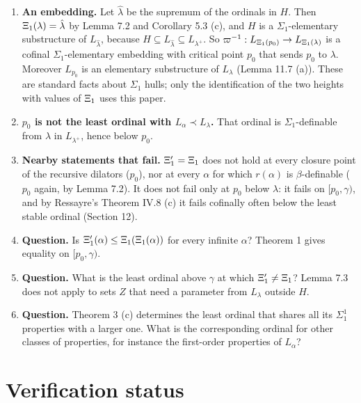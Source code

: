 \documentclass[11pt]{article}
\begin{document}
\begin{enumerate}
\item \textbf{An embedding.} Let $\hat \lambda$ be the supremum of the ordinals in $H$. Then $\Xi_1(\lambda) = \hat \lambda$ by Lemma
  7.2 and Corollary 5.3 (c), and $H$ is a $\Sigma_1$-elementary substructure of $L_{\hat \lambda}$, because
  $H \subseteq L_{\hat \lambda} \subseteq L_{\lambda^+}$. So $\varpi^{-1} : L_{\Xi_1(p_0)} \to L_{\Xi_1(\lambda)}$ is a cofinal
  $\Sigma_1$-elementary embedding with critical point $p_0$ that sends $p_0$ to $\lambda$. Moreover $L_{p_0}$ is
  an elementary substructure of $L_\lambda$ (Lemma 11.7 (a)). These are standard facts about $\Sigma_1$ hulls; only the
  identification of the two heights with values of $\Xi_1$ uses this paper.
\item \textbf{$p_0$ is not the least ordinal with $L_{\alpha} \prec L_\lambda$.} That ordinal is $\Sigma_1$-definable
  from $\lambda$ in $L_{\lambda^+}$, hence below $p_0$.
\item \textbf{Nearby statements that fail.} $\Xi'_1 = \Xi_1$ does not hold at every closure point of the recursive
  dilators ($p_0$), nor at every $\alpha$ for which $r(\alpha)$ is $\beta$-definable ($p_0$ again, by Lemma
  7.2). It does not fail only at $p_0$ below $\lambda$: it fails on $[p_0, \gamma)$, and by Ressayre's Theorem IV.8
  (c) it fails cofinally often below the least stable ordinal (Section 12).
\item \textbf{Question.} Is $\Xi'_1(\alpha) \le \Xi_1(\Xi_1(\alpha))$ for every infinite $\alpha$? Theorem 1 gives
  equality on $[p_0, \gamma)$.
\item \textbf{Question.} What is the least ordinal above $\gamma$ at which $\Xi'_1 \ne \Xi_1$? Lemma 7.3 does not
  apply to sets $Z$ that need a parameter from $L_\lambda$ outside $H$.
\item \textbf{Question.} Theorem 3 (c) determines the least ordinal that shares all its $\Sigma^1_1$ properties
  with a larger one. What is the corresponding ordinal for other classes of properties, for instance the
  first-order properties of $L_{\alpha}$?
\end{enumerate}

\section{Verification status}
\end{document}
